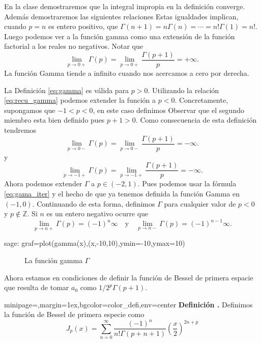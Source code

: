 \documentclass{article}
\newenvironment{colbox}[2]{%
    \begin{adjustbox}{minipage={\linewidth},margin=1ex,bgcolor=#1,env=center}
        #2}{%
    \end{adjustbox}%
}
\newcounter{defi_cont}
\newenvironment{definicion}[1]{\begin{colbox}{color_defi}{\refstepcounter{defi_cont}\textbf{Definición \arabic{defi_cont}.} #1}}{\end{colbox}}
\begin{document}
En la clase demostraremos que la integral impropia en la definición converge. Además demostraremos las siguientes relaciones
Estas igualdades  implican, cuando $p=n$ es entero positivo, que $\Gamma(n+1)=n\Gamma(n)=\cdots=n!\Gamma(1)=n!$. Luego podemos ver a la función gamma como una extensión de la función factorial a los reales no negativos. Notar que
\[\lim_{p\to 0+}\Gamma(p)=\lim_{p\to 0+}\frac{\Gamma(p+1)}{p}=+\infty.\]
La función Gamma tiende a  infinito cuando nos acercamos a cero por derecha.

La Definición \ref{eq:gamma} es válida para $p>0$. Utilizando la relación \eqref{eq:recu_gamma} podemos extender la función a $p<0$. Concretamente,  supongamos  que $-1<p<0$, en  este caso definimos
Observar que el segundo miembro esta bien definido pues $p+1>0$. Como consecuencia de esta definición tendremos
\[\lim_{p\to 0-}\Gamma(p)=\lim_{p\to 0-}\frac{\Gamma(p+1)}{p}=-\infty.\]
y 
\[\lim_{p\to -1+}\Gamma(p)=\lim_{p\to -1+}\frac{\Gamma(p+1)}{p}=-\infty.\] 
Ahora podemos extender $\Gamma$ a $p\in (-2,1)$. Pues  podemos usar la fórmula \eqref{eq:gama_iter} y el hecho de que ya tenemos definida la función Gamma en $(-1,0)$. Continuando de esta forma, definimos $\Gamma$ para cualquier valor de $p<0$ y $p\notin \mathbb{Z}$. Si $n$ es un entero negativo ocurre que
\[\lim_{p\to n+}\Gamma(p)=(-1)^n\infty\quad\text{y}\quad \lim_{p\to n-}\Gamma(p)=(-1)^{n-1}\infty.\] 

\begin{sagecommandline}
 sage: graf=plot(gamma(x),(x,-10,10),ymin=-10,ymax=10)
\end{sagecommandline}

\begin{figure}[h]
\caption{La función gamma $\Gamma$}
\end{figure}
Ahora estamos en condiciones de definir la función de Bessel de primera espacie que resulta de tomar $a_0$ como $1/2^p\Gamma(p+1)$.

\begin{definicion}\label{def:bessel_primera} Definimos la función de Bessel de primera especie como
\[J_p(x)=\sum_{n=0}^{\infty}\frac{(-1)^n}{n!\Gamma(p+n+1)}\left(\frac{x}{2}\right)^{2n+p}\]
\end{definicion}
\end{document}
